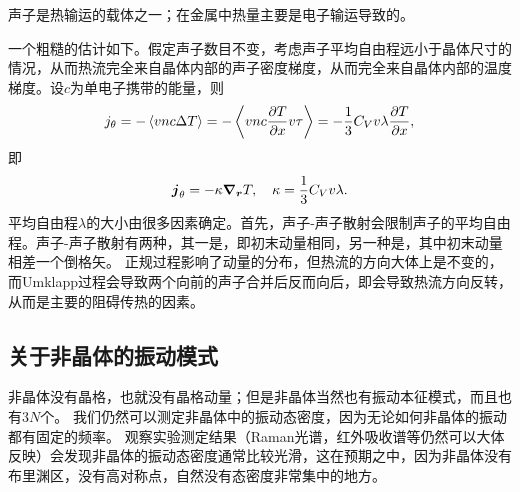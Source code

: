 声子是热输运的载体之一；在金属中热量主要是电子输运导致的。

一个粗糙的估计如下。假定声子数目不变，考虑声子平均自由程远小于晶体尺寸的情况，从而热流完全来自晶体内部的声子密度梯度，从而完全来自晶体内部的温度梯度。设$c$为单电子携带的能量，则
\[
    j_\theta = - \expval*{v n c \Delta T} = - \expval{v n c \pdv{T}{x} v \tau} = - \frac{1}{3} C_V v \lambda \pdv{T}{x},
\]
即
\begin{equation}
    \vb*{j}_\theta = -\kappa \grad_{\vb*{r}} T, \quad \kappa = \frac{1}{3} C_V v \lambda.
\end{equation}
平均自由程$\lambda$的大小由很多因素确定。首先，声子-声子散射会限制声子的平均自由程。声子-声子散射有两种，其一是，即初末动量相同，另一种是，其中初末动量相差一个倒格矢。
正规过程影响了动量的分布，但热流的方向大体上是不变的，而Umklapp过程会导致两个向前的声子合并后反而向后，即会导致热流方向反转，从而是主要的阻碍传热的因素。

\subsection{关于非晶体的振动模式}

非晶体没有晶格，也就没有晶格动量；但是非晶体当然也有振动本征模式，而且也有$3N$个。
我们仍然可以测定非晶体中的振动态密度，因为无论如何非晶体的振动都有固定的频率。
观察实验测定结果（Raman光谱，红外吸收谱等仍然可以大体反映）会发现非晶体的振动态密度通常比较光滑，这在预期之中，因为非晶体没有布里渊区，没有高对称点，自然没有态密度非常集中的地方。